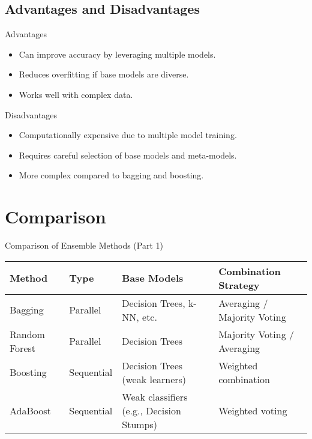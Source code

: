 \documentclass[serif, aspectratio=169]{beamer}
\begin{document}
\subsection{Advantages and Disadvantages}
\begin{frame}{Advantages}
    \begin{itemize}
        \item Can improve accuracy by leveraging multiple models.
        \item Reduces overfitting if base models are diverse.
        \item Works well with complex data.
    \end{itemize}
\end{frame}

    
\begin{frame}{Disadvantages}
    \begin{itemize}
        \item Computationally expensive due to multiple model training.
        \item Requires careful selection of base models and meta-models.
        \item More complex compared to bagging and boosting.
    \end{itemize}
\end{frame}

\section{Comparison}

\begin{frame}{Comparison of Ensemble Methods (Part 1)}
    \centering
    \renewcommand{\arraystretch}{1.2} %
    \begin{tabular}{|p{2cm}|p{2cm}|p{3cm}|p{4cm}|}
        \hline
        \textbf{Method} & \textbf{Type} & \textbf{Base Models} & \textbf{Combination Strategy} \\
        \hline
        Bagging & Parallel & Decision Trees, k-NN, etc. & Averaging / Majority Voting \\
        \hline
        Random Forest & Parallel & Decision Trees & Majority Voting / Averaging \\
        \hline
        Boosting & Sequential & Decision Trees (weak learners) & Weighted combination \\
        \hline
        AdaBoost & Sequential & Weak classifiers (e.g., Decision Stumps) & Weighted voting \\
        \hline
    \end{tabular}
\end{frame}
\end{document}
